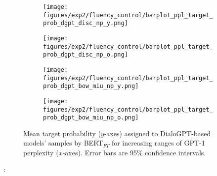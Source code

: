 \begin{figure}[H]
     \centering
     \begin{subfigure}[b]{0.48\textwidth}
        \centering
        \texttt{[image: figures/exp2/fluency\_control/barplot\_ppl\_target\_prob\_dgpt\_disc\_np\_y.png]}
        \caption{}
        \label{subfig:barplot_ppl_target_prob_np_dgpt_disc_young}
     \end{subfigure}
     \quad
     \begin{subfigure}[b]{0.48\textwidth}
        \centering
        \texttt{[image: figures/exp2/fluency\_control/barplot\_ppl\_target\_prob\_dgpt\_disc\_np\_o.png]}
        \caption{}
        \label{subfig:barplot_ppl_target_prob_np_dgpt_disc_old}
     \end{subfigure}
    \medskip
    \begin{subfigure}[b]{0.48\textwidth}
        \centering
        \texttt{[image: figures/exp2/fluency\_control/barplot\_ppl\_target\_prob\_dgpt\_bow\_miu\_np\_y.png]}
        \caption{}
        \label{subfig:barplot_ppl_target_prob_np_dgpt_bow_young}
     \end{subfigure}
    \quad
     \begin{subfigure}[b]{0.48\textwidth}
        \centering
        \texttt{[image: figures/exp2/fluency\_control/barplot\_ppl\_target\_prob\_dgpt\_bow\_miu\_np\_o.png]}
        \caption{}
        \label{subfig:barplot_ppl_target_prob_np_dgpt_bow_old}
     \end{subfigure}
    \caption{Mean target probability ($y$-axes) assigned to DialoGPT-based models' samples by BERT$_{FT}$ for increasing ranges of GPT-1 perplexity ($x$-axes). Error bars are 95\% confidence intervals.}
    \label{fig:barplot_ppl_target_prob_np_dgpt}
\end{figure}

:

